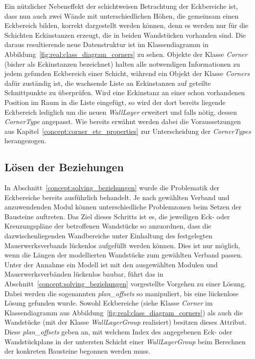 Ein nützlicher Nebeneffekt der schichtweisen Betrachtung der Eckbereiche ist, dass nun auch zwei Wände mit unterschiedlichen Höhen, die gemeinsam einen Eckbereich bilden, korrekt dargestellt werden können, denn es werden nur für die Schichten Eckinstanzen erzeugt, die in beiden Wandstücken vorhanden sind.
Die daraus resultierende neue Datenstruktur ist im Klassendiagramm in Abbildung~\ref{fig:real:class_diagram_corners} zu sehen.
Objekte der Klasse \textit{Corner} (bisher als Eckinstanzen bezeichnet) halten alle notwendigen Informationen zu jedem gefunden Eckbereich einer Schicht, während ein Objekt der Klasse \textit{Corners} dafür zuständig ist, die wachsende Liste an Eckinstanzen auf geteilte Schnittpunkte zu überprüfen.
Wird eine Eckinstanz an einer schon vorhandenen Position im Raum in die Liste eingefügt, so wird der dort bereits liegende Eckbereich lediglich um die neuen \textit{WallLayer} erweitert und falls nötig, dessen \textit{CornerType} angepasst.
Wie bereits erwähnt werden dabei die Voraussetzungen aus Kapitel~\ref{concept:corner_etc_properties} zur Unterscheidung der \textit{CornerTypes} herangezogen.

\subsection*{Lösen der Beziehungen}
In Abschnitt~\ref{concept:solving_beziehungen} wurde die Problematik der Eckbereiche bereits ausführlich behandelt.
Je nach gewählten Verband und anzuwendenden Modul können unterschiedliche Problemzonen beim Setzen der Bausteine auftreten.
Das Ziel dieses Schritts ist es, die jeweiligen Eck- oder Kreuzungspläne der betroffenen Wandstücke so anzuordnen, dass die dazwischenliegenden Wandbereiche unter Einhaltung des festgelegten Mauerwerksverbands lückenlos aufgefüllt werden können.
Dies ist nur möglich, wenn die Längen der modellierten Wandstücke zum gewählten Verband passen.
Unter der Annahme ein Modell ist mit den ausgewählten Modulen und Mauerwerksverbänden lückenlos baubar, führt das in Abschnitt~\ref{concept:solving_beziehungen} vorgestellte Vorgehen zu einer Lösung. 
Dabei werden die sogenannten \textit{plan\_offsets} so manipuliert, bis eine lückenlose Lösung gefunden wurde.
Sowohl Eckbereiche (siehe Klasse \textit{Corner} im Klassendiagramm aus Abbildung~\ref{fig:real:class_diagram_corners}) als auch die Wandstücke (mit der Klasse \textit{WallLayerGroup} realisiert) besitzen dieses Attribut.
Diese \textit{plan\_offsets} geben an, mit welchem Index des angegebenen Eck- oder Wandstückplans in der untersten Schicht einer \textit{WallLayerGroup} beim Berechnen der konkreten Bausteine begonnen werden muss.

